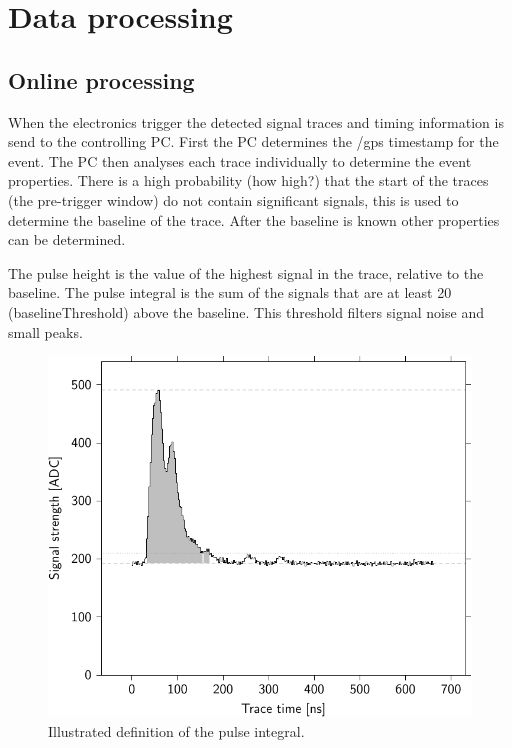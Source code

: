 \chapter{Data processing}
\label{ch:data_processing}

\section{Online processing}

When the \hisparc electronics trigger the detected signal traces and timing information is send to the controlling PC. First the PC determines the /gps timestamp for the event. The PC then analyses each trace individually to determine the event properties. There is a high probability (how high?) that the start of the traces (the pre-trigger window) do not contain significant signals, this is used to determine the baseline of the trace. After the baseline is known other properties can be determined.

The pulse height is the value of the highest signal in the trace, relative to the baseline. The pulse integral is the sum of the signals that are at least \SI{20}{\adc} (baselineThreshold) above the baseline. This threshold filters signal noise and small peaks.

\begin{figure}
    \centering
    \includegraphics[width=0.7\linewidth]{plots/processing/integral}
    \caption{Illustrated definition of the pulse integral.}
    \label{fig:integral}
\end{figure}


